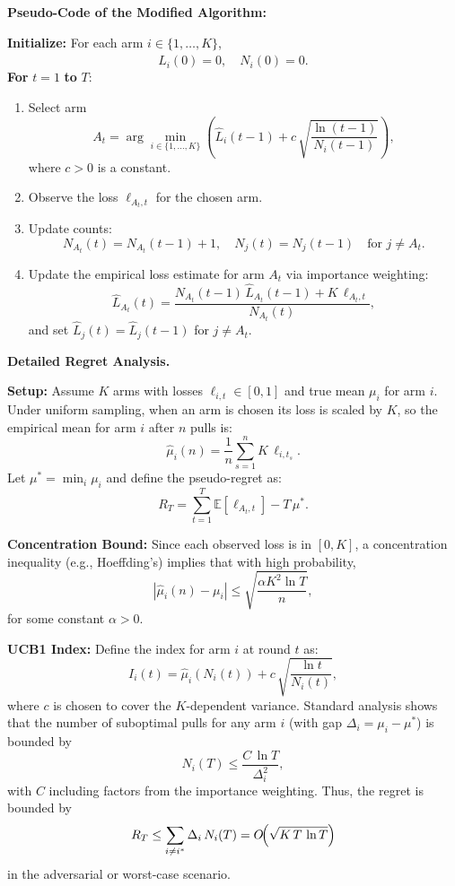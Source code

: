 \medskip
\noindent
\textbf{Pseudo-Code of the Modified Algorithm:}
\medskip

\noindent \textbf{Initialize:} For each arm \(i \in \{1,\dots,K\}\),
\[
    \widehat{L}_i(0) = 0,\quad N_i(0)=0.
\]
\noindent
\textbf{For} \(t=1\) \textbf{to} \(T\):
\begin{enumerate}
    \item Select arm 
    \[
      A_t = \arg\min_{i\in\{1,\dots,K\}} \left(\widehat{L}_i(t-1) + c\,\sqrt{\frac{\ln(t-1)}{N_i(t-1)}}\right),
    \]
    where \(c>0\) is a constant.
    \item Observe the loss \(\ell_{A_t,t}\) for the chosen arm.
    \item Update counts:
    \[
      N_{A_t}(t)=N_{A_t}(t-1)+1,\quad N_j(t)=N_j(t-1) \quad\text{for } j\neq A_t.
    \]
    \item Update the empirical loss estimate for arm \(A_t\) via importance weighting:
    \[
      \widehat{L}_{A_t}(t)=\frac{N_{A_t}(t-1)\,\widehat{L}_{A_t}(t-1)+K\,\ell_{A_t,t}}{N_{A_t}(t)},
    \]
    and set \(\widehat{L}_j(t)=\widehat{L}_j(t-1)\) for \(j\neq A_t\).
\end{enumerate}

\medskip
\noindent
\textbf{Detailed Regret Analysis.}

\medskip
\noindent
\textbf{Setup:}  
Assume \(K\) arms with losses \(\ell_{i,t}\in[0,1]\) and true mean \(\mu_i\) for arm \(i\).  
Under uniform sampling, when an arm is chosen its loss is scaled by \(K\), so the empirical mean for arm \(i\) after \(n\) pulls is:
\[
  \widehat{\mu}_i(n)=\frac{1}{n}\sum_{s=1}^{n} K\,\ell_{i,t_s}.
\]
Let \(\mu^*=\min_i \mu_i\) and define the pseudo-regret as:
\[
  R_T=\sum_{t=1}^T \mathbb{E}[\ell_{A_t,t}] - T\,\mu^*.
\]

\medskip
\noindent
\textbf{Concentration Bound:}  
Since each observed loss is in \([0,K]\), a concentration inequality (e.g., Hoeffding's) implies that with high probability,
\[
  |\widehat{\mu}_i(n)-\mu_i|\le \sqrt{\frac{\alpha K^2\ln T}{n}},
\]
for some constant \(\alpha>0\).

\medskip
\noindent
\textbf{UCB1 Index:}  
Define the index for arm \(i\) at round \(t\) as:
\[
  I_i(t)=\widehat{\mu}_i(N_i(t)) + c\,\sqrt{\frac{\ln t}{N_i(t)}},
\]
where \(c\) is chosen to cover the \(K\)-dependent variance.  
Standard analysis shows that the number of suboptimal pulls for any arm \(i\) (with gap \(\Delta_i=\mu_i-\mu^*\)) is bounded by
\[
  N_i(T)\le \frac{C\,\ln T}{\Delta_i^2},
\]
with \(C\) including factors from the importance weighting.  
Thus, the regret is bounded by
\[
  R_T \le \sum_{i\neq i^*}\Delta_i\,N_i(T) = O\!\Bigl(\sqrt{K\,T\,\ln T}\Bigr)
\]
in the adversarial or worst-case scenario.

